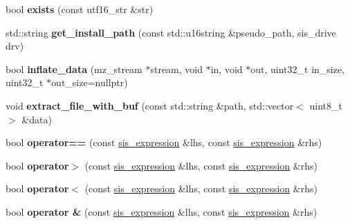 \begin{DoxyCompactItemize}
bool {\bfseries exists} (const utf16\+\_\+str \&str)
\item 
\mbox{\label{namespaceeka2l1_1_1loader_a2ba758cdecff2117246f2ba4c2421e88}} 
std\+::string {\bfseries get\+\_\+install\+\_\+path} (const std\+::u16string \&pseudo\+\_\+path, sis\+\_\+drive drv)
\item 
\mbox{\label{namespaceeka2l1_1_1loader_aa2311d82e56378fafed1f02cb8fead54}} 
bool {\bfseries inflate\+\_\+data} (mz\+\_\+stream $\ast$stream, void $\ast$in, void $\ast$out, uint32\+\_\+t in\+\_\+size, uint32\+\_\+t $\ast$out\+\_\+size=nullptr)
\item 
\mbox{\label{namespaceeka2l1_1_1loader_aa8f3b36f50de0ad8cc740ee1605fcd54}} 
void {\bfseries extract\+\_\+file\+\_\+with\+\_\+buf} (const std\+::string \&path, std\+::vector$<$ uint8\+\_\+t $>$ \&data)
\item 
\mbox{\label{namespaceeka2l1_1_1loader_ad74c02ba1919d925cb36fef811a628b6}} 
bool {\bfseries operator==} (const \mbox{\hyperlink{structeka2l1_1_1loader_1_1sis__expression}{sis\+\_\+expression}} \&lhs, const \mbox{\hyperlink{structeka2l1_1_1loader_1_1sis__expression}{sis\+\_\+expression}} \&rhs)
\item 
\mbox{\label{namespaceeka2l1_1_1loader_a77643d26ef5501a1bd94c04f2d8c3ee6}} 
bool {\bfseries operator$>$} (const \mbox{\hyperlink{structeka2l1_1_1loader_1_1sis__expression}{sis\+\_\+expression}} \&lhs, const \mbox{\hyperlink{structeka2l1_1_1loader_1_1sis__expression}{sis\+\_\+expression}} \&rhs)
\item 
\mbox{\label{namespaceeka2l1_1_1loader_ae3bd951c5956305a1e17fccc2085741f}} 
bool {\bfseries operator$<$} (const \mbox{\hyperlink{structeka2l1_1_1loader_1_1sis__expression}{sis\+\_\+expression}} \&lhs, const \mbox{\hyperlink{structeka2l1_1_1loader_1_1sis__expression}{sis\+\_\+expression}} \&rhs)
\item 
\mbox{\label{namespaceeka2l1_1_1loader_ae2d8bbe0b206a0daa524bdca3313452f}} 
bool {\bfseries operator \&} (const \mbox{\hyperlink{structeka2l1_1_1loader_1_1sis__expression}{sis\+\_\+expression}} \&lhs, const \mbox{\hyperlink{structeka2l1_1_1loader_1_1sis__expression}{sis\+\_\+expression}} \&rhs)

\end{DoxyCompactItemize}
